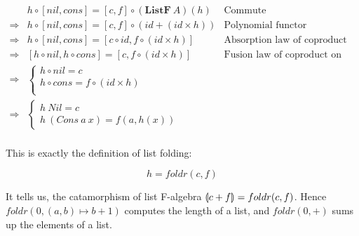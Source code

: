 \documentclass{article}
\begin{document}
\begin{example}
\[
\begin{array}{rll}
            & h \circ [nil, cons] = [c, f] \circ (\mathbf{ListF}\ A)(h) & \text{Commute} \\
\Rightarrow & h \circ [nil, cons] = [c, f] \circ (id + (id \times h)) & \text{Polynomial functor} \\
\Rightarrow & h \circ [nil, cons] = [c \circ id, f \circ (id \times h)] & \text{Absorption law of coproduct on the right} \\
\Rightarrow & [h \circ nil, h \circ cons] = [c, f \circ (id \times h)] & \text{Fusion law of coproduct on the left} \\
\Rightarrow &
  \begin{cases}
    h \circ nil = c \\
    h \circ cons = f \circ (id \times h) \\
  \end{cases} & \\
\Rightarrow &
  \begin{cases}
    h\ Nil = c \\
    h\ (Cons\ a\ x) = f(a, h(x))
  \end{cases} & \\
\end{array}
\]

This is exactly the definition of list folding:

\[
  h = foldr(c, f)
\]

It tells us, the catamorphism of list F-algebra $\llparenthesis c + f \rrparenthesis = foldr(c, f)$. Hence $foldr(0, (a, b) \mapsto b + 1)$ computes the length of a list, and $foldr(0, +)$ sums up the elements of a list.
\end{example}
\end{document}

